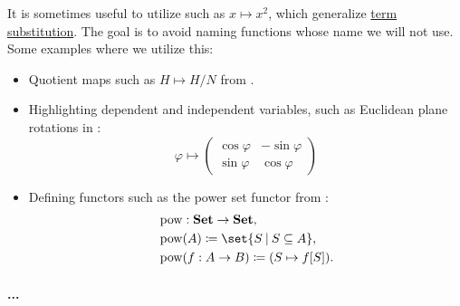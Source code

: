 \begin{remark}\label{rem:implicit_function_notation}
  It is sometimes useful to utilize  such as \( x \mapsto x^2 \), which generalize \hyperref[def:first_order_substitution/term_in_term]{term substitution}. The goal is to avoid naming functions whose name we will not use. Some examples where we utilize this:
  \begin{itemize}
    \item Quotient maps such as \( H \mapsto H / N \) from .
    \item Highlighting dependent and independent variables, such as Euclidean plane rotations in :
    \begin{equation*}
      \varphi
      \mapsto
      \begin{pmatrix}
        \cos \varphi & -\sin \varphi \\
        \sin \varphi & \cos \varphi
      \end{pmatrix}
    \end{equation*}

    \item Defining functors such as the power set functor from :
    \begin{equation*}
      \begin{aligned}
        &\pow: \cat{Set} \to \cat{Set}, \\
        &\pow(A) \coloneqq \set{ S \given S \subseteq A }, \\
        &\pow(f: A \to B) \coloneqq (S \mapsto f[S]). \\
      \end{aligned}
    \end{equation*}
  \end{itemize}
\end{remark}

\paragraph{...}

